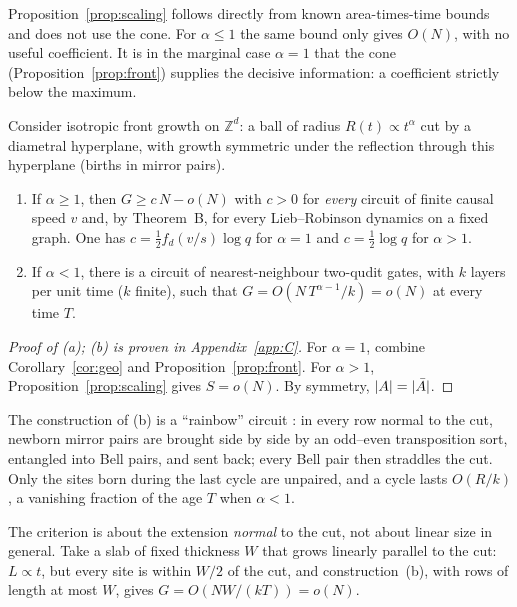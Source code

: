 Proposition~\ref{prop:scaling} follows directly from known area-times-time bounds and does not use the cone. For $\alpha\le1$ the same bound only gives $O(N)$, with no useful coefficient. It is in the marginal case $\alpha=1$ that the cone (Proposition~\ref{prop:front}) supplies the decisive information: a coefficient strictly below the maximum.

\begin{theoremL}\label{thm:C}
Consider isotropic front growth on $\mathbb Z^d$: a ball of radius $R(t)\propto t^\alpha$ cut by a diametral hyperplane, with growth symmetric under the reflection through this hyperplane (births in mirror pairs).
\begin{enumerate}[label=(\alph*),leftmargin=*]
\item If $\alpha\ge1$, then $G\ge c\,N-o(N)$ with $c>0$ for \emph{every} circuit of finite causal speed $v$ and, by Theorem~B, for every Lieb--Robinson dynamics on a fixed graph. One has $c=\frac12f_d(v/s)\log q$ for $\alpha=1$ and $c=\frac12\log q$ for $\alpha>1$.
\item If $\alpha<1$, there is a circuit of nearest-neighbour two-qudit gates, with $k$ layers per unit time ($k$ finite), such that $G=O(N\,T^{\alpha-1}/k)=o(N)$ at every time $T$.
\end{enumerate}
\end{theoremL}

\begin{proof}[Proof of (a); (b) is proven in Appendix~\ref{app:C}]
For $\alpha=1$, combine Corollary~\ref{cor:geo} and Proposition~\ref{prop:front}. For $\alpha>1$, Proposition~\ref{prop:scaling} gives $S=o(N)$. By symmetry, $|A|=|\bar A|$.
\end{proof}

The construction of (b) is a ``rainbow'' circuit \cite{Vitagliano2010}: in every row normal to the cut, newborn mirror pairs are brought side by side by an odd--even transposition sort, entangled into Bell pairs, and sent back; every Bell pair then straddles the cut. Only the sites born during the last cycle are unpaired, and a cycle lasts $O(R/k)$, a vanishing fraction of the age $T$ when $\alpha<1$.

\begin{remark}\label{rem:slab}
The criterion is about the extension \emph{normal} to the cut, not about linear size in general. Take a slab of fixed thickness $W$ that grows linearly parallel to the cut: $L\propto t$, but every site is within $W/2$ of the cut, and construction~(b), with rows of length at most $W$, gives $G=O(NW/(kT))=o(N)$.
\end{remark}

